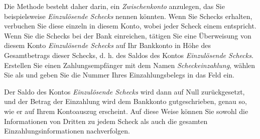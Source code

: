 Die Methode besteht daher darin, ein \emph{Zwischenkonto} anzulegen, das Sie beispielsweise \emph{Einzulösende Schecks} nennen könnten. Wenn Sie Schecks erhalten, verbuchen Sie diese einzeln in diesem Konto, wobei jeder Scheck einem  entspricht. Wenn Sie die Schecks bei der Bank einreichen, tätigen Sie eine Überweisung von diesem Konto \emph{Einzulösende Schecks} auf Ihr Bankkonto in Höhe des Gesamtbetrags dieser Schecks, d. h. des Saldos des Kontos \emph{Einzulösende Schecks}. Erstellen Sie einen Zahlungsempfänger mit dem Namen \emph{Scheckeinzahlung}, wählen Sie  als  und geben Sie die Nummer Ihres Einzahlungsbelegs in das Feld  ein.

Der Saldo des Kontos \emph{Einzulösende Schecks} wird dann auf Null zurückgesetzt, und der Betrag der Einzahlung wird dem Bankkonto gutgeschrieben, genau so, wie er auf Ihrem Kontoauszug erscheint. Auf diese Weise können Sie sowohl die Informationen von Dritten zu jedem Scheck als auch die gesamten Einzahlungsinformationen nachverfolgen.

